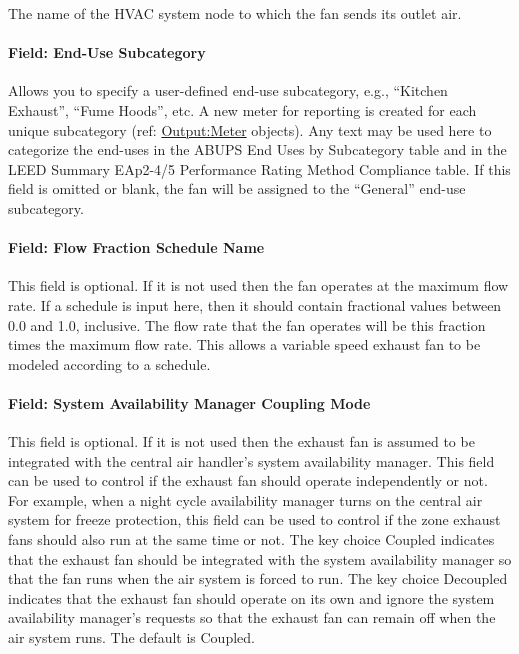 The name of the HVAC system node to which the fan sends its outlet air.

\paragraph{Field: End-Use Subcategory}\label{field-end-use-subcategory-3}

Allows you to specify a user-defined end-use subcategory, e.g., ``Kitchen Exhaust'', ``Fume Hoods'', etc. A new meter for reporting is created for each unique subcategory (ref: \hyperref[outputmeter-and-outputmetermeterfileonly]{Output:Meter} objects). Any text may be used here to categorize the end-uses in the ABUPS End Uses by Subcategory table and in the LEED Summary EAp2-4/5 Performance Rating Method Compliance table. If this field is omitted or blank, the fan will be assigned to the ``General'' end-use subcategory.

\paragraph{Field: Flow Fraction Schedule Name}\label{field-flow-fraction-schedule-name}

This field is optional. If it is not used then the fan operates at the maximum flow rate. If a schedule is input here, then it should contain fractional values between 0.0 and 1.0, inclusive. The flow rate that the fan operates will be this fraction times the maximum flow rate. This allows a variable speed exhaust fan to be modeled according to a schedule.

\paragraph{Field: System Availability Manager Coupling Mode}\label{field-system-availability-manager-coupling-mode}

This field is optional. If it is not used then the exhaust fan is assumed to be integrated with the central air handler's system availability manager. This field can be used to control if the exhaust fan should operate independently or not. For example, when a night cycle availability manager turns on the central air system for freeze protection, this field can be used to control if the zone exhaust fans should also run at the same time or not. The key choice Coupled indicates that the exhaust fan should be integrated with the system availability manager so that the fan runs when the air system is forced to run. The key choice Decoupled indicates that the exhaust fan should operate on its own and ignore the system availability manager's requests so that the exhaust fan can remain off when the air system runs. The default is Coupled.

